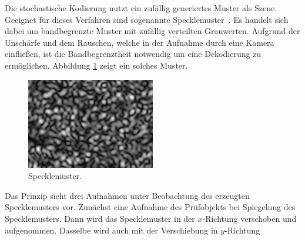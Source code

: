 Die stochastische Kodierung nutzt ein zufällig generiertes Muster als Szene.
Geeignet für dieses Verfahren sind sogenannte \glqq Specklemuster\grqq ~\cite{specklePattern}.
Es handelt sich dabei um bandbegrenzte Muster mit zufällig verteilten Grauwerten.
Aufgrund der Unschärfe und dem Rauschen, welche in der Aufnahme durch eine Kamera einfließen, ist die Bandbegrenztheit notwendig um eine Dekodierung zu ermöglichen.
Abbildung \ref{img:speckleMuster} zeigt ein solches Muster.
%
\begin{figure}[H]
	\centering
	\includegraphics[frame,width=0.5\textwidth]{02_grundlagenZurDeflektometrie/rekonstruktion/stochastischeKodierung/figures/speckleMuster}
	\caption[Specklemuster]{Specklemuster.}
	\label{img:speckleMuster}
\end{figure}
%
Das Prinzip sieht drei Aufnahmen unter Beobachtung des erzeugten Specklemusters vor.
Zunächst eine Aufnahme des Prüfobjekts bei Spiegelung des Specklemusters.
Dann wird das Specklemuster in der $x$-Richtung verschoben und aufgenommen.
Dasselbe wird auch mit der Verschiebung in $y$-Richtung 